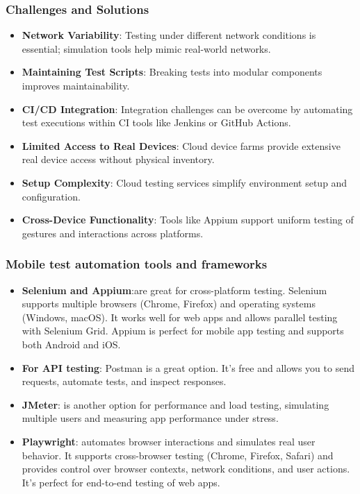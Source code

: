 \documentclass[a4paper, 12pt]{article}
\begin{document}
\subsubsection{Challenges and Solutions}
\begin{itemize}

\item \textbf{Network Variability}: Testing under different network conditions is essential; simulation tools help mimic real-world networks.

\item \textbf{Maintaining Test Scripts}: Breaking tests into modular components improves maintainability.

\item \textbf{CI/CD Integration}: Integration challenges can be overcome by automating test executions within CI tools like Jenkins or GitHub Actions.

\item \textbf{Limited Access to Real Devices}: Cloud device farms provide extensive real device access without physical inventory.

\item \textbf{Setup Complexity}: Cloud testing services simplify environment setup and configuration.

\item \textbf{Cross-Device Functionality}: Tools like Appium support uniform testing of gestures and interactions across platforms.
\end{itemize}
\subsubsection{Mobile test automation tools and frameworks}
\begin{itemize}
\item \textbf{Selenium and Appium}:are great for cross-platform testing. Selenium supports multiple browsers (Chrome, Firefox) and operating systems (Windows, macOS). It works well for web apps and allows parallel testing with Selenium Grid. Appium is perfect for mobile app testing and supports both Android and iOS.
\item \textbf{For API testing}: Postman is a great option. It's free and allows you to send requests, automate tests, and inspect responses.
\item \textbf{JMeter}: is another option for performance and load testing, simulating multiple users and measuring app performance under stress.
\item \textbf{Playwright}: automates browser interactions and simulates real user behavior. It supports cross-browser testing (Chrome, Firefox, Safari) and provides control over browser contexts, network conditions, and user actions. It’s perfect for end-to-end testing of web apps.
\end{itemize}
\end{document}

